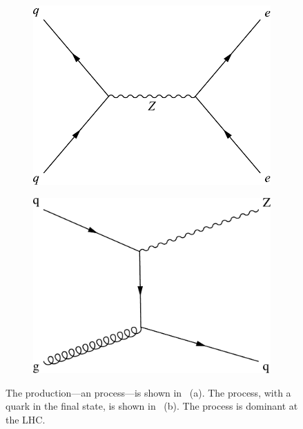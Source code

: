 \begin{figure}[!htbp]
    \centering
    \begin{subfigure}[b]{\StackedPlotWidth}
        \includegraphics[width=\linewidth]{figures/feyn_drell_yan_s_channel.pdf}
        \caption{}
        \label{fig:feyn_drell_yan_s_channel}
    \end{subfigure}
    \begin{subfigure}[b]{\StackedPlotWidth}
        \includegraphics[width=\linewidth]{figures/feyn_drell_yan_t_channel.pdf}
        \caption{}
        \label{fig:feyn_drell_yan_t_channel}
    \end{subfigure}
    \caption[
       Diagrams of \Ztoee production in the \sChannel and \tChannel.
    ]{
        The \DrellYan \Ztoee production---an \sChannel process---is shown in
        \FIG~(a). The \tChannel process, with a quark in the final state, is
        shown in \FIG~(b). The \tChannel process is dominant at the LHC.
    }
    \label{fig:feyn_s_t_channel}
\end{figure}
